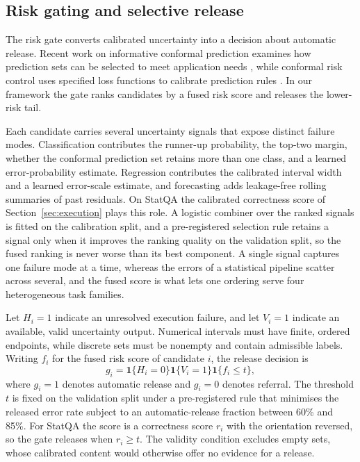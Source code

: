 \documentclass[preprint,12pt,authoryear]{elsarticle}
\begin{document}
\subsection{Risk gating and selective release}
\label{sec:risk_gating}

{\color{blue}
The risk gate converts calibrated uncertainty into a decision about
automatic release. Recent work on informative conformal prediction examines how
prediction sets can be selected to meet application needs
\cite{gazin2025selecting}, while conformal risk control uses
specified loss functions to calibrate prediction rules
\cite{angelopoulos2024conformal}. In our framework the gate
ranks candidates by a fused risk score and releases the
lower-risk tail.

Each candidate carries several uncertainty signals that expose
distinct failure modes. Classification contributes the runner-up
probability, the top-two margin, whether the conformal
prediction set retains more than one class, and a learned
error-probability estimate. Regression contributes the calibrated interval width
and a learned error-scale estimate, and forecasting adds
leakage-free rolling summaries of past residuals. On StatQA the
calibrated correctness score of Section~\ref{sec:execution}
plays this role. A logistic combiner over the ranked signals is
fitted on the calibration split, and a pre-registered selection
rule retains a signal only when it improves the ranking quality
on the validation split, so the fused ranking is never worse
than its best component. A single signal captures one failure
mode at a time, whereas the errors of a statistical pipeline
scatter across several, and the fused score is what lets one
ordering serve four heterogeneous task families.

Let \(H_i=1\) indicate an unresolved execution failure,
and let \(V_i=1\) indicate an available, valid uncertainty output.
Numerical intervals must have finite, ordered endpoints, while
discrete sets must be nonempty and contain admissible labels.
Writing \(f_i\) for the fused risk score of candidate \(i\),
the release decision is
\begin{equation}
    g_i
    =
    \mathbf{1}\{H_i=0\}
    \mathbf{1}\{V_i=1\}
    \mathbf{1}\{f_i\leq t\},
    \label{eq:unified_release_gate}
\end{equation}
where \(g_i=1\) denotes automatic release and \(g_i=0\) denotes referral.
The threshold \(t\) is fixed on the validation split under a
pre-registered rule that minimises the released error rate
subject to an automatic-release fraction between 60\% and 85\%.
For StatQA the score is a correctness score \(r_i\) with the
orientation reversed, so the gate releases when \(r_i\geq t\).
The validity condition excludes empty sets, whose calibrated
content would otherwise offer no evidence for a release.}
\end{document}
